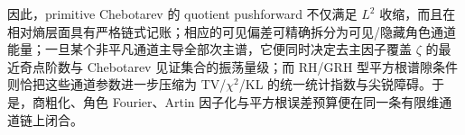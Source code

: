\noindent
因此，primitive Chebotarev 的 quotient pushforward 不仅满足 \(L^2\) 收缩，而且在相对熵层面具有严格链式记账；相应的可见偏差可精确拆分为可见/隐藏角色通道能量；一旦某个非平凡通道主导全部次主谱，它便同时决定去主因子覆盖 \(\zeta\) 的最近奇点阶数与 Chebotarev 见证集合的振荡量级；而 RH/GRH 型平方根谱隙条件则恰把这些通道参数进一步压缩为 TV/\(\chi^2\)/KL 的统一统计指数与尖锐障碍。于是，商粗化、角色 Fourier、Artin 因子化与平方根误差预算便在同一条有限维通道链上闭合。

\endinput
